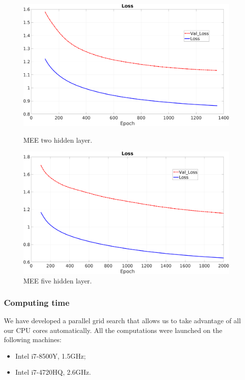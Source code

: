 \vspace{0.5cm}
\begin{figure}[H]
	\centering
	\begin{minipage}[t]{0.5\linewidth}
		\includegraphics[width=\linewidth]{img/Cup_loss_Reg_Zoom_2l.png}
		\caption{MEE two hidden layer.}
		\label{img::twolayer}
	\end{minipage}%
	\begin{minipage}[t]{0.5\linewidth}
		\includegraphics[width=\linewidth]{img/Cup_loss_Reg_Zoom_5l.png}
		\caption{MEE five hidden layer.}
		\label{img::fivelayer}
	\end{minipage}
\end{figure}

\subsubsection{Computing time}
We have developed a parallel grid search that allows us to take advantage of all our CPU cores automatically. All the computations were launched on the following machines:
\begin{itemize}
	\item Intel i7-8500Y, 1.5GHz;
	\item Intel i7-4720HQ, 2.6GHz.
	
\end{itemize}

